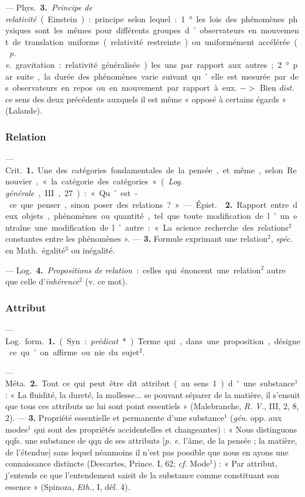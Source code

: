 — \si{Phys.} {\bf 3.} {\it Principe de relativité} (Einstein) : principe
selon lequel : 1° les lois des phénomènes physiques sont les mêmes pour
différents groupes d’observateurs en mouvement de translation uniforme
(relativité restreinte) ou uniformément accélérée ({\it p. e.} gravitation :
relativité généralisée) les uns par rapport aux autres; 2° par suite, la
durée des phénomènes varie suivant qu’elle est mesurée par des observateurs
en repos ou en mouvement par rapport à eux. $->$ Bien {\it dist.} ce sens des
deux précédents auxquels il est même « opposé à certains égards » (Lalande).

\subsubsection{Relation}
 — \si{Crit.} {\bf 1.} Une des catégories fondamentales de la
pensée, et même, selon Renouvier, « la catégorie des catégories » ({\it Log.
générale}, III, 27) : « Qu'est-ce que penser, sinon poser des relations ? »

— \si{Épist.}  {\bf 2.} Rapport entre
deux objets, phénomènes ou quantité,
tel que toute modification de l’un entraîne une modification de l’autre : «
La science recherche des relations$^2$ constantes entre les phénomènes ». —
 {\bf 3.} Formule exprimant une relation$^2$, {\it spéc.} en
\si{Math.} égalité$^3$ ou inégalité.

— \si{Log.} {\bf 4.} {\it Propositions de relation} : celles qui énoncent une
relation$^2$ autre que celle d’{\it inhérence}$^2$ (v. ce mot).

\subsubsection{Attribut}
 — \si{Log.} \si{form.} {\bf 1.} (Syn. : {\it prédicat}*). Terme qui, dans
une proposition, désigne ce qu’on affirme
ou nie du sujet$^2$.

— \si{Méta.} {\bf 2.} Tout ce qui peut être
dit attribut (au sens 1) d'une substance$^1$ : « La fluidité, la dureté, la
mollesse... se pouvant séparer de la
matière, il s'ensuit que tous ces
attributs ne lui sont point essentiels » (Malebranche, {\it R. V.}, III, 2,
8, 2). — {\bf 3.} Propriété essentielle et
permanente d’une substance$^1$ ({\it gén}.
opp. aux modes$^1$ qui sont des propriétés accidentelles et changeantes) :
« Nous distinguons qqfs. une substance de qqn de ses attributs [{\it p. e.}
l'âme, de la pensée ; la matière, de
l'étendue] sans lequel néanmoins il
n’est pas possible que nous en ayons
une connaissance distincte (Descartes, Prince. I, 62; {\it cf.}  Mode$^1$) :
« Par attribut, j'entends ce que
l’entendement saisit de la substance
comme constituant son essence »
(Spinoza, {\it Eth.}, I, déf. 4).


